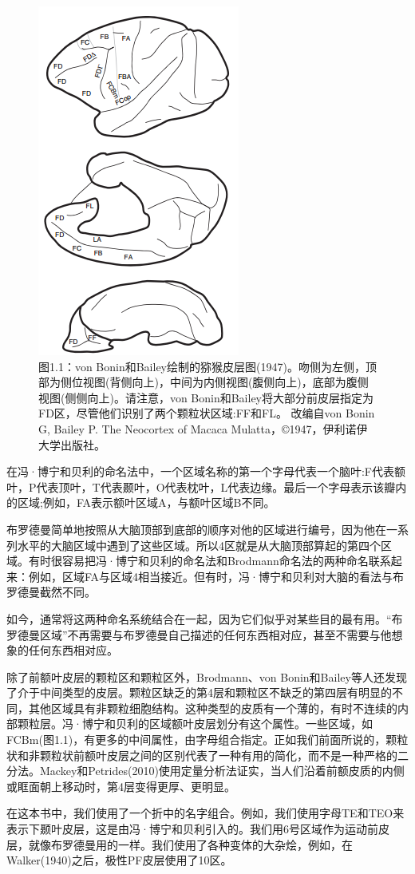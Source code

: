 \begin{figure}[!htb]
	\centering
	\includegraphics[width=0.5\linewidth]{image_pfc/Fig_1_1}
	\caption*{图1.1：von Bonin和Bailey绘制的猕猴皮层图(1947)。吻侧为左侧，顶部为侧位视图(背侧向上)，中间为内侧视图(腹侧向上)，底部为腹侧视图(侧侧向上)。请注意，von Bonin和Bailey将大部分前皮层指定为FD区，尽管他们识别了两个颗粒状区域:FF和FL。
		改编自von Bonin G, Bailey P. The Neocortex of Macaca Mulatta，©1947，伊利诺伊大学出版社。}
\end{figure}

\par
在冯·博宁和贝利的命名法中，一个区域名称的第一个字母代表一个脑叶:F代表额叶，P代表顶叶，T代表颞叶，O代表枕叶，L代表边缘。最后一个字母表示该瓣内的区域;例如，FA表示额叶区域A，与额叶区域B不同。
\par
布罗德曼简单地按照从大脑顶部到底部的顺序对他的区域进行编号，因为他在一系列水平的大脑区域中遇到了这些区域。所以4区就是从大脑顶部算起的第四个区域。有时很容易把冯·博宁和贝利的命名法和Brodmann命名法的两种命名联系起来：例如，区域FA与区域4相当接近。但有时，冯·博宁和贝利对大脑的看法与布罗德曼截然不同。
\par
如今，通常将这两种命名系统结合在一起，因为它们似乎对某些目的最有用。“布罗德曼区域”不再需要与布罗德曼自己描述的任何东西相对应，甚至不需要与他想象的任何东西相对应。
\par
除了前额叶皮层的颗粒区和颗粒区外，Brodmann、von Bonin和Bailey等人还发现了介于中间类型的皮层。颗粒区缺乏的第4层和颗粒区不缺乏的第四层有明显的不同，其他区域具有非颗粒细胞结构。这种类型的皮质有一个薄的，有时不连续的内部颗粒层。冯·博宁和贝利的区域额叶皮层划分有这个属性。一些区域，如FCBm(图1.1)，有更多的中间属性，由字母组合指定。正如我们前面所说的，颗粒状和非颗粒状前额叶皮层之间的区别代表了一种有用的简化，而不是一种严格的二分法。Mackey和Petrides(2010)使用定量分析法证实，当人们沿着前额皮质的内侧或眶面朝上移动时，第4层变得更厚、更明显。
\par
在这本书中，我们使用了一个折中的名字组合。例如，我们使用字母TE和TEO来表示下颞叶皮层，这是由冯·博宁和贝利引入的。我们用6号区域作为运动前皮层，就像布罗德曼用的一样。我们使用了各种变体的大杂烩，例如，在Walker(1940)之后，极性PF皮层使用了10区。



